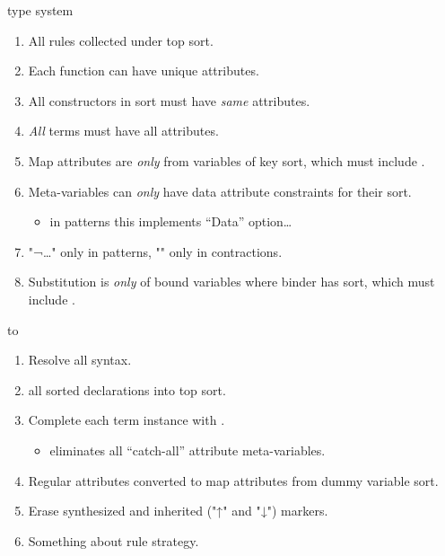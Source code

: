 \documentclass[pdftex,aspectratio=169,14pt]{beamer}
\begin{document}
\begin{frame}[fragile]{\hax type system}\small
  \begin{enumerate}

  \item All rules collected under top sort.

  \item Each  function can have unique attributes.

  \item All  constructors in sort must have \emph{same} attributes.

  \item \emph{All} terms must have all attributes.

  \item Map attributes are \emph{only} from variables of key sort, which must include .

  \item Meta-variables can \emph{only} have data attribute constraints for their sort.
    \begin{itemize}
    \item in patterns this implements ``Data'' option…
    \end{itemize}

  \item "{¬…}" only in patterns, "{}" only in contractions.

  \item Substitution is \emph{only} of bound variables where binder has sort, which must include
    .

  \end{enumerate}
\end{frame}

\begin{frame}{\HAX to \hax}
  \begin{enumerate}

  \item Resolve all syntax.

  \item {} all sorted declarations into top sort.

  \item Complete each term instance with .
    \begin{itemize}
    \item eliminates all ``catch-all'' attribute meta-variables.
    \end{itemize}

  \item Regular attributes converted to map attributes from dummy variable sort.

  \item Erase synthesized and inherited ("↑" and "↓") markers.

  \item \alert{Something about rule strategy.}

  \end{enumerate}
\end{frame}
\end{document}

